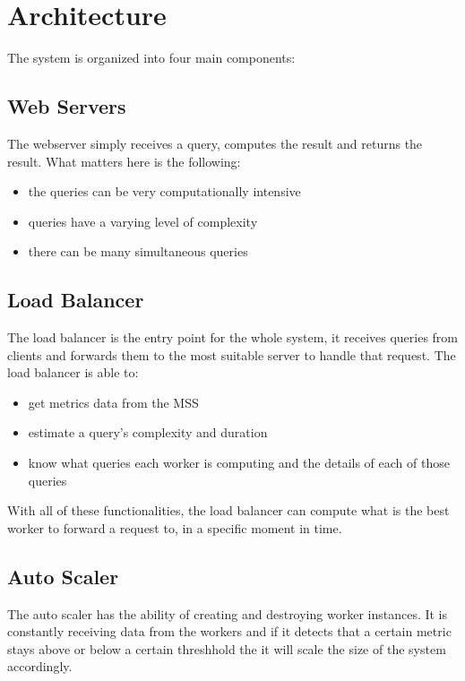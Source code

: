 \documentclass[10pt,twocolumn]{article}
\begin{document}
\section{Architecture}

The system is organized into four main components:

\subsection*{Web Servers}

The webserver simply receives a query, computes the result and returns the result. What matters here is the following:

\begin{itemize}
    \item the queries can be very computationally intensive
    \item queries have a varying level of complexity
    \item there can be many simultaneous queries
\end{itemize}

\subsection*{Load Balancer}

The load balancer is the entry point for the whole system, it receives queries from clients and forwards them to the most suitable server to handle
that request. The load balancer is able to:

\begin{itemize}
    \item get metrics data from the MSS
    \item estimate a query's complexity and duration
    \item know what queries each worker is computing and the details of each of those queries
\end{itemize}

With all of these functionalities, the load balancer can compute what is the best worker to forward a request to, in a specific moment in time.

\subsection*{Auto Scaler}

The auto scaler has the ability of creating and destroying worker instances.
It is constantly receiving data from the workers and if it detects that a certain metric stays above or below a certain threshhold
the it will scale the size of the system accordingly.
\end{document}
